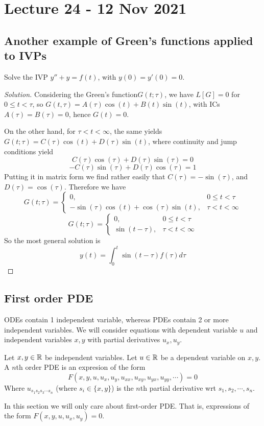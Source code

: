 \section{Lecture 24 - 12 Nov 2021}
\subsection{Another example of Green's functions applied to IVPs}
\begin{example}
  Solve the IVP $y''+y=f(t)$, with $y(0)=y'(0)=0$.
\end{example}
\begin{proof}[Solution]
  Considering the Green's function$G(t;\tau)$, we have $L[G]=0$ for $0\leq t<\tau$, so
  $G(t,\tau)=A(\tau)\cos(t)+B(t)\sin(t)$, with ICs $A(\tau)=B(\tau)=0$, hence $G(t)=0$.

  On the other hand, for $\tau<t<\infty$, the same yields
  $G(t;\tau)=C(\tau)\cos(t)+D(\tau)\sin(t)$, where continuity and jump conditions yield
  \[C(\tau)\cos(\tau)+D(\tau)\sin(\tau)=0\]
  \[-C(\tau)\sin(\tau)+D(\tau)\cos(\tau)=1\]
  Putting it in matrix form we find rather easily that $C(\tau)=-\sin(\tau)$, and
  $D(\tau)=\cos(\tau)$. Therefore we have 
  \[ G(t;\tau) = 
    \begin{cases}
      0, & 0\leq t< \tau\\
      -\sin(\tau)\cos(t) + \cos(\tau)\sin(t), & \tau< t< \infty
    \end{cases}
  \]
  \[ G(t;\tau) = 
    \begin{cases}
      0, & 0\leq t< \tau\\
      \sin(t-\tau), & \tau< t< \infty
    \end{cases}
  \]
  So the most general solution is
  \[y(t)=\int_0^t \sin(t-\tau)f(\tau) d\tau\]
\end{proof}
\subsection{First order PDE}
ODEs contain 1 independent variable, whereas PDEs contain 2 or more independent variables.
We will consider equations with dependent variable $u$ and independent variables $x,y$
with partial derivatives $u_x,u_y$. 
\begin{definition}
  Let $x,y\in\mathbb R$ be independent variables. Let $u\in\mathbb R$ be a dependent variable on
  $x,y$. A $n$th order PDE is an expresion of the form 
  \[F(x,y,u,u_x,u_y, u_{xx},u_{xy},u_{yx}, u_{yy}, \cdots)=0\]
  Where $u_{s_1s_2s_3\cdots s_n}$ (where $s_i\in \{x,y\}$) is the $n$th partial derivative
  wrt $s_1,s_2,\cdots,s_n$.
  \label{def:firstOrdPDE}
\end{definition}
In this section we will only care about first-order PDE. That is, expressions of the form
$F(x,y,u,u_x,u_y)=0$.

